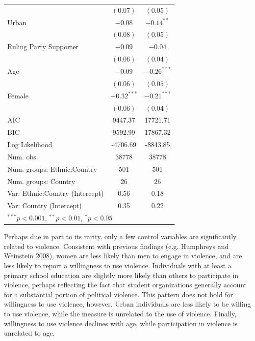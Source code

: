 \documentclass[12pt,]{book}
\let\origtable\table
\let\endorigtable\endtable
\renewenvironment{table}[1][2] {
    \singlespacing
    \expandafter\origtable\expandafter[H]
} {
    \endorigtable
}
\theoremstyle{definition}
\theoremstyle{definition}
\theoremstyle{definition}
\theoremstyle{remark}
\begin{document}
\begin{table}
\begin{center}
\begin{tabular}{l c c }
                                        & $(0.07)$      & $(0.05)$      \\
Urban                                   & $-0.08$       & $-0.14^{**}$  \\
                                        & $(0.08)$      & $(0.05)$      \\
Ruling Party Supporter                  & $-0.09$       & $-0.04$       \\
                                        & $(0.06)$      & $(0.04)$      \\
Age                                     & $-0.09$       & $-0.26^{***}$ \\
                                        & $(0.06)$      & $(0.05)$      \\
Female                                  & $-0.32^{***}$ & $-0.21^{***}$ \\
                                        & $(0.06)$      & $(0.04)$      \\
\hline
AIC                                     & 9447.37       & 17721.71      \\
BIC                                     & 9592.99       & 17867.32      \\
Log Likelihood                          & -4706.69      & -8843.85      \\
Num. obs.                               & 38778         & 38778         \\
Num. groups: Ethnic:Country             & 501           & 501           \\
Num. groups: Country                    & 26            & 26            \\
Var: Ethnic:Country (Intercept)         & 0.56          & 0.18          \\
Var: Country (Intercept)                & 0.35          & 0.22          \\
\hline
\multicolumn{3}{l}{\scriptsize{$^{***}p<0.001$, $^{**}p<0.01$, $^*p<0.05$}}
\end{tabular}
\caption{Multilevel Models of Attitudes Toward Violence}
\label{tab:violence}
\end{center}
\end{table}

Perhaps due in part to its rarity, only a few control variables are
significantly related to violence. Consistent with previous findings
(e.g. Humphreys and Weinstein
\protect\hyperlink{ref-Humphreys2008}{2008}), women are less likely than
men to engage in violence, and are less likely to report a willingness
to use violence. Individuals with at least a primary school education
are slightly more likely than others to participate in violence, perhaps
reflecting the fact that student organizations generally account for a
substantial portion of political violence. This pattern does not hold
for willingness to use violence, however. Urban individuals are less
likely to be willing to use violence, while the measure is unrelated to
the use of violence. Finally, willingness to use violence declines with
age, while participation in violence is unrelated to age.
\end{document}
